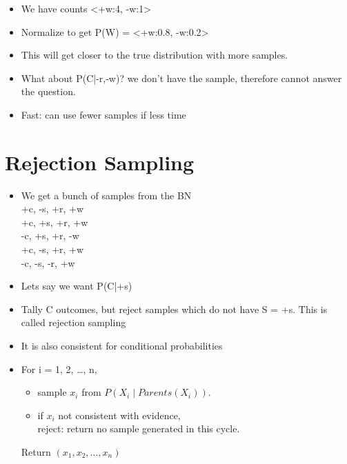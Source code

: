 \documentclass[11pt,a4paper]{report}
\begin{document}
\begin{itemize}
\begin{itemize}
\begin{itemize}
                    \item We have counts <+w:4, -w:1>
                    \item Normalize to get P(W) = <+w:0.8, -w:0.2>
                    \item This will get closer to the true distribution with more samples.
                    \item What about P(C|-r,-w)? we don't have the sample, therefore cannot answer the question.
                    \item Fast: can use fewer samples if less time
                \end{itemize}
        \end{itemize}
\end{itemize}

\section{Rejection Sampling}

\begin{itemize}
    \item We get a bunch of samples from the BN \\
    +c, -s, +r, +w \\
    +c, +s, +r, +w \\
    -c, +s, +r, -w \\
    +c, -s, +r, +w \\
    -c, -s, -r, +w \\
    \item Lets say we want P(C|+s)
    \item Tally C outcomes, but reject samples which do not have S = +s. This is called rejection sampling
    \item It is also consistent for conditional probabilities

    \item For i = 1, 2, \ldots, n, \\
        \begin{itemize}
            \item sample $x_{i}$ from $P(X_{i} \mid Parents(X_{i}))$. \\
            \item if $x_{i}$ not consistent with evidence, \\
                reject: return no sample generated in this cycle.
        \end{itemize}

    Return $(x_{1}, x_{2}, \ldots, x_{n})$
\end{itemize}
\end{document}
